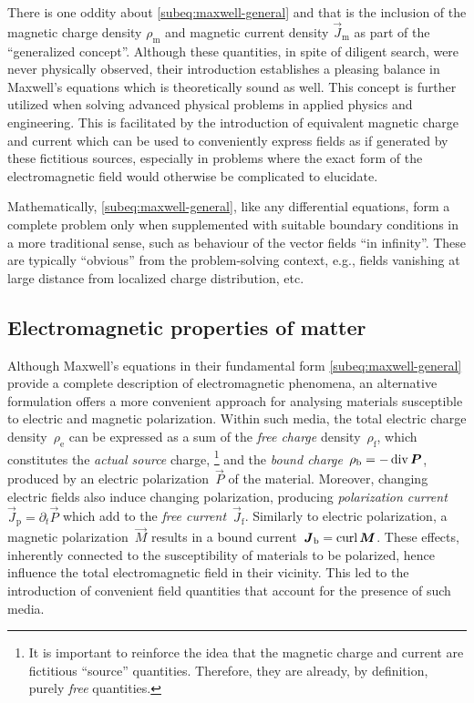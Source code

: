 \documentclass[11pt,a4paper,twoside,openany]{report}
\begin{document}
There is one oddity about \cref{subeq:maxwell-general} and that is the inclusion of the magnetic charge density $\rho_{\mathrm m}$ and magnetic current density $\vec J_{\mathrm m}$ as part of the \enquote{generalized concept}. Although these quantities, in spite of diligent search, were never physically observed, their introduction establishes a pleasing balance in Maxwell's equations which is theoretically sound as well. This concept is further utilized when solving advanced physical problems in applied physics and engineering. This is facilitated by the introduction of equivalent magnetic charge and current which can be used to conveniently express fields as if generated by these fictitious sources, especially in problems where the exact form of the electromagnetic field would otherwise be complicated to elucidate.

Mathematically, \cref{subeq:maxwell-general}, like any differential equations, form a complete problem only when supplemented with suitable boundary conditions in a more traditional sense, such as behaviour of the vector fields \enquote{in infinity}. These are typically \enquote{obvious} from the problem-solving context, e.g., fields vanishing at large distance from localized charge distribution, etc.

\subsection{Electromagnetic properties of matter}
Although Maxwell's equations in their fundamental form \eqref{subeq:maxwell-general} provide a complete description of electromagnetic phenomena, an alternative formulation offers a more convenient approach for analysing materials susceptible to electric and magnetic polarization. Within such media, the total electric charge density~$\rho_{\mathrm e}$ can be expressed as a sum of the \emph{free charge} density~$\rho_{\mathrm f}$, which constitutes the \emph{actual source} charge,%
    \footnote{It is important to reinforce the idea that the magnetic charge and current are fictitious \enquote{source} quantities. Therefore, they are already, by definition, purely \emph{free} quantities.}
and the \emph{bound charge}~$\rho_{\mathrm b}=-\operatorname{div}\boldsymbol P$, produced by an electric polarization~$\vec P$ of the material. Moreover, changing electric fields also induce changing polarization, producing \emph{polarization current}~$\vec J_{\mathrm p}=\partial_t\vec P$ which add to the \emph{free current}~$\vec J_{\mathrm f}$. Similarly to electric polarization, a magnetic polarization~$\vec M$ results in a bound current~$\boldsymbol J_{\mathrm b}=\operatorname{curl}\boldsymbol M$. These effects, inherently connected to the susceptibility of materials to be polarized, hence influence the total electromagnetic field in their vicinity. This led to the introduction of convenient field quantities that account for the presence of such media.
\end{document}
